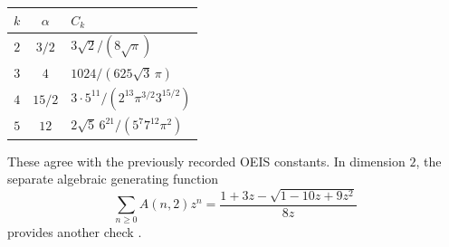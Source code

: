 \documentclass[11pt]{article}
\theoremstyle{remark}\newtheorem{remark}[theorem]{Remark}
\begin{document}
\begin{center}
\begin{tabular}{@{}ccl@{}}\toprule
$k$ & $\alpha$ & $C_k$ \\ \midrule
$2$ & $3/2$ & $3\sqrt2/(8\sqrt\pi)$ \\[3pt]
$3$ & $4$ & $1024/(625\sqrt3\,\pi)$ \\[3pt]
$4$ & $15/2$ & $3\cdot5^{11}/(2^{13}\pi^{3/2}3^{15/2})$ \\[3pt]
$5$ & $12$ & $2\sqrt5\,6^{21}/(5^7 7^{12}\pi^2)$ \\ \bottomrule
\end{tabular}
\end{center}
These agree with the previously recorded OEIS constants. In dimension $2$, the separate algebraic generating function
\begin{equation}\label{orp:eq:k2gf}
 \sum_{n\ge0}A(n,2)z^n
 =\frac{1+3z-\sqrt{1-10z+9z^2}}{8z}
\end{equation}
provides another check \cite{oeis2}.
\end{document}
